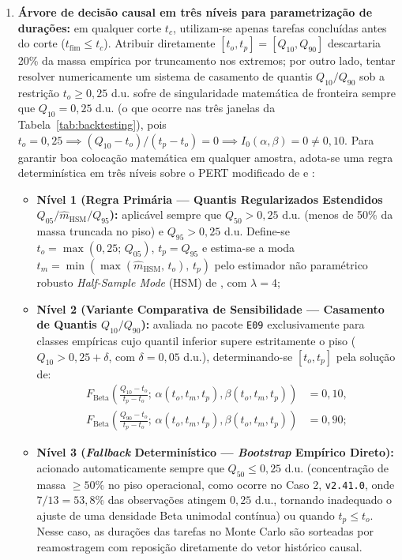 \documentclass[12pt,openany,oneside,a4paper,english,brazilian,sumario=tradicional]{abntex2}
\begin{document}
\begin{enumerate}
  \item \textbf{Árvore de decisão causal em três níveis para parametrização de durações:} em qualquer corte $t_c$, utilizam-se apenas tarefas concluídas antes do corte ($t_{\mathrm{fim}} \le t_c$). Atribuir diretamente $[t_o, t_p] = [Q_{10}, Q_{90}]$ descartaria 20\% da massa empírica por truncamento nos extremos; por outro lado, tentar resolver numericamente um sistema de casamento de quantis $Q_{10}/Q_{90}$ sob a restrição $t_o \ge 0{,}25$ d.u. sofre de singularidade matemática de fronteira sempre que $Q_{10} = 0{,}25$ d.u. (o que ocorre nas três janelas da Tabela~\ref{tab:backtesting}), pois $t_o = 0{,}25 \implies (Q_{10}-t_o)/(t_p-t_o) = 0 \implies I_0(\alpha,\beta)=0 \ne 0{,}10$. Para garantir boa colocação matemática em qualquer amostra, adota-se uma regra determinística em três níveis sobre o PERT modificado de  e :
  \begin{itemize}
    \item \textbf{Nível 1 (Regra Primária --- Quantis Regularizados Estendidos $Q_{05}/\hat{m}_{\mathrm{HSM}}/Q_{95}$):} aplicável sempre que $Q_{50} > 0{,}25$ d.u. (menos de 50\% da massa truncada no piso) e $Q_{95} > 0{,}25$ d.u. Define-se $t_o = \max(0{,}25;\,Q_{05})$, $t_p = Q_{95}$ e estima-se a moda $t_m = \min(\max(\hat{m}_{\mathrm{HSM}},\,t_o),\,t_p)$ pelo estimador não paramétrico robusto \textit{Half-Sample Mode} (HSM) de , com $\lambda=4$;
    \item \textbf{Nível 2 (Variante Comparativa de Sensibilidade --- Casamento de Quantis $Q_{10}/Q_{90}$):} avaliada no pacote \texttt{E09} exclusivamente para classes empíricas cujo quantil inferior supere estritamente o piso ($Q_{10} > 0{,}25 + \delta$, com $\delta=0{,}05$ d.u.), determinando-se $[t_o, t_p]$ pela solução de:
    \begin{equation}\label{eq:quantile_matching}
    \begin{aligned}
    F_{\mathrm{Beta}}\!\left(\frac{Q_{10}-t_o}{t_p-t_o};\,\alpha(t_o,t_m,t_p),\beta(t_o,t_m,t_p)\right) &= 0{,}10,\\
    F_{\mathrm{Beta}}\!\left(\frac{Q_{90}-t_o}{t_p-t_o};\,\alpha(t_o,t_m,t_p),\beta(t_o,t_m,t_p)\right) &= 0{,}90;
    \end{aligned}
    \end{equation}
    \item \textbf{Nível 3 (\textit{Fallback} Determinístico --- \textit{Bootstrap} Empírico Direto):} acionado automaticamente sempre que $Q_{50} \le 0{,}25$ d.u. (concentração de massa $\ge 50\%$ no piso operacional, como ocorre no Caso 2, \texttt{v2.41.0}, onde $7/13 = 53{,}8\%$ das observações atingem $0{,}25$ d.u., tornando inadequado o ajuste de uma densidade Beta unimodal contínua) ou quando $t_p \le t_o$. Nesse caso, as durações das tarefas no Monte Carlo são sorteadas por reamostragem com reposição diretamente do vetor histórico causal.

\end{itemize}
\end{enumerate}
\end{document}
